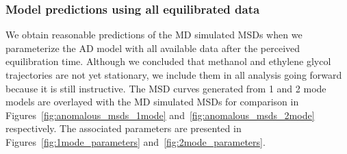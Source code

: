 \documentclass{article}
\begin{document}
  
  \subsubsection{Model predictions using all equilibrated data}\label{section:AD_all_data}
  
  We obtain reasonable predictions of the MD simulated MSDs when we parameterize the AD 
  model with all available data after the perceived equilibration time. Although we 
  concluded that methanol and ethylene glycol trajectories are not yet stationary, we 
  include them in all analysis going forward because it is still instructive. 
  The MSD curves generated from 1 and 2 mode models are overlayed with the MD simulated MSDs for 
  comparison in Figures~\ref{fig:anomalous_msds_1mode} and~\ref{fig:anomalous_msds_2mode}
  respectively. The associated parameters are presented in Figures~\ref{fig:1mode_parameters}
  and~\ref{fig:2mode_parameters}.
  
\end{document}
